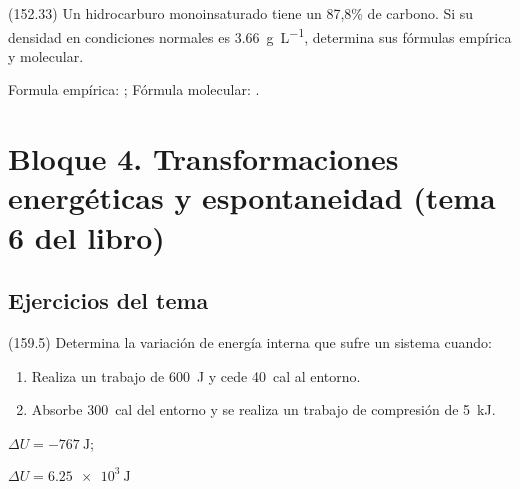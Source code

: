 \documentclass[10pt,a5paper,twoside]{article}
\begin{document}
  \begin{solution}
  \end{solution}




  \begin{exercise}[
      tags    = {},
      topics  = {química, química orgánica, orgánica},
      source  = {FQ 1B MGH 2016, p152, e33},
    ]
    (152.33) Un hidrocarburo monoinsaturado tiene un 87,8\% de carbono.
    Si su densidad en condiciones normales es \SI{3,66}{\gram\per\liter}, determina sus fórmulas empírica y molecular.
  \end{exercise}

  \begin{solution}
    Formula empírica: ; Fórmula molecular: .
  \end{solution}







\section{Bloque 4. Transformaciones energéticas y espontaneidad (tema 6 del libro)}

\subsection*{Ejercicios del tema}

  \begin{exercise}[
      tags    = {},
      topics  = {química, termodinámica, termoquímica},
      source  = {FQ 1B MGH 2016, p159, e5},
    ]
    (159.5) Determina la variación de energía interna que sufre un sistema
    cuando:
    \begin{enumerate}
      \item Realiza un trabajo de \SI{600}{\joule} y cede \SI{40}{cal} al entorno.
      \item Absorbe \SI{300}{cal} del entorno y se realiza un trabajo de compresión de \SI{5}{\kilo\joule}.
    \end{enumerate}
  \end{exercise}

  \begin{solution}
    \begin{enumerate*}
      \item \( \Delta U = \SI{-767}{\joule} \); \item \( \Delta U = \SI{6.25e3}{\joule} \)
    \end{enumerate*}
  \end{solution}
\end{document}
